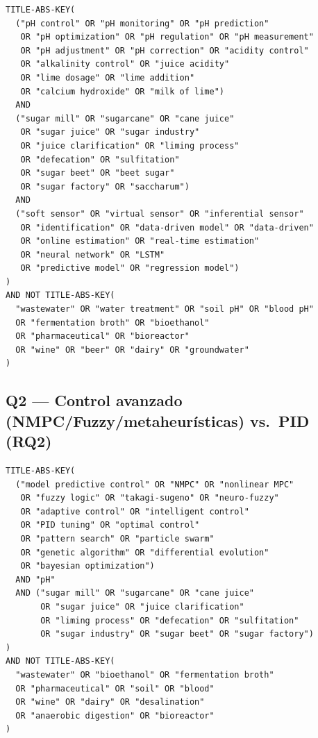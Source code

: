\begin{lstlisting}[language={},caption={Cadena Q1 (Scopus). Las cadenas
equivalentes para WoS e IEEE~Xplore se obtienen sustituyendo el operador
de campo (\texttt{TS=} en WoS; sin prefijo en IEEE).},label={lst:q1}]
TITLE-ABS-KEY(
  ("pH control" OR "pH monitoring" OR "pH prediction"
   OR "pH optimization" OR "pH regulation" OR "pH measurement"
   OR "pH adjustment" OR "pH correction" OR "acidity control"
   OR "alkalinity control" OR "juice acidity"
   OR "lime dosage" OR "lime addition"
   OR "calcium hydroxide" OR "milk of lime")
  AND
  ("sugar mill" OR "sugarcane" OR "cane juice"
   OR "sugar juice" OR "sugar industry"
   OR "juice clarification" OR "liming process"
   OR "defecation" OR "sulfitation"
   OR "sugar beet" OR "beet sugar"
   OR "sugar factory" OR "saccharum")
  AND
  ("soft sensor" OR "virtual sensor" OR "inferential sensor"
   OR "identification" OR "data-driven model" OR "data-driven"
   OR "online estimation" OR "real-time estimation"
   OR "neural network" OR "LSTM"
   OR "predictive model" OR "regression model")
)
AND NOT TITLE-ABS-KEY(
  "wastewater" OR "water treatment" OR "soil pH" OR "blood pH"
  OR "fermentation broth" OR "bioethanol"
  OR "pharmaceutical" OR "bioreactor"
  OR "wine" OR "beer" OR "dairy" OR "groundwater"
)
\end{lstlisting}

\subsection*{Q2 --- Control avanzado (NMPC/Fuzzy/metaheurísticas) vs.\ PID (RQ2)}

\begin{lstlisting}[language={},caption={Cadena Q2 (Scopus).},label={lst:q2}]
TITLE-ABS-KEY(
  ("model predictive control" OR "NMPC" OR "nonlinear MPC"
   OR "fuzzy logic" OR "takagi-sugeno" OR "neuro-fuzzy"
   OR "adaptive control" OR "intelligent control"
   OR "PID tuning" OR "optimal control"
   OR "pattern search" OR "particle swarm"
   OR "genetic algorithm" OR "differential evolution"
   OR "bayesian optimization")
  AND "pH"
  AND ("sugar mill" OR "sugarcane" OR "cane juice"
       OR "sugar juice" OR "juice clarification"
       OR "liming process" OR "defecation" OR "sulfitation"
       OR "sugar industry" OR "sugar beet" OR "sugar factory")
)
AND NOT TITLE-ABS-KEY(
  "wastewater" OR "bioethanol" OR "fermentation broth"
  OR "pharmaceutical" OR "soil" OR "blood"
  OR "wine" OR "dairy" OR "desalination"
  OR "anaerobic digestion" OR "bioreactor"
)
\end{lstlisting}

